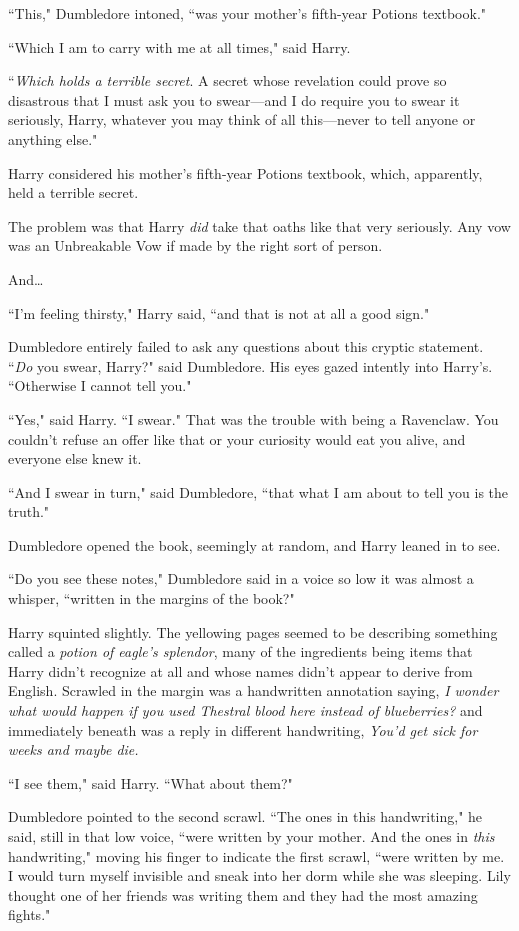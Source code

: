 ``This," Dumbledore intoned, ``was your mother's fifth-year Potions textbook."

``Which I am to carry with me at all times," said Harry.

``\emph{Which holds a terrible secret}. A secret whose revelation could prove so disastrous that I must ask you to swear—and I do require you to swear it seriously, Harry, whatever you may think of all this—never to tell anyone or anything else."

Harry considered his mother's fifth-year Potions textbook, which, apparently, held a terrible secret.

The problem was that Harry \emph{did} take that oaths like that very seriously. Any vow was an Unbreakable Vow if made by the right sort of person.

And{\ldots}

``I'm feeling thirsty," Harry said, ``and that is not at all a good sign."

Dumbledore entirely failed to ask any questions about this cryptic statement. ``\emph{Do} you swear, Harry?" said Dumbledore. His eyes gazed intently into Harry's. ``Otherwise I cannot tell you."

``Yes," said Harry. ``I swear." That was the trouble with being a Ravenclaw. You couldn't refuse an offer like that or your curiosity would eat you alive, and everyone else knew it.

``And I swear in turn," said Dumbledore, ``that what I am about to tell you is the truth."

Dumbledore opened the book, seemingly at random, and Harry leaned in to see.

``Do you see these notes," Dumbledore said in a voice so low it was almost a whisper, ``written in the margins of the book?"

Harry squinted slightly. The yellowing pages seemed to be describing something called a \emph{potion of eagle's splendor}, many of the ingredients being items that Harry didn't recognize at all and whose names didn't appear to derive from English. Scrawled in the margin was a handwritten annotation saying, \emph{I wonder what would happen if you used Thestral blood here instead of blueberries?} and immediately beneath was a reply in different handwriting, \emph{You'd get sick for weeks and maybe die.}

``I see them," said Harry. ``What about them?"

Dumbledore pointed to the second scrawl. ``The ones in this handwriting," he said, still in that low voice, ``were written by your mother. And the ones in \emph{this} handwriting," moving his finger to indicate the first scrawl, ``were written by me. I would turn myself invisible and sneak into her dorm while she was sleeping. Lily thought one of her friends was writing them and they had the most amazing fights."

